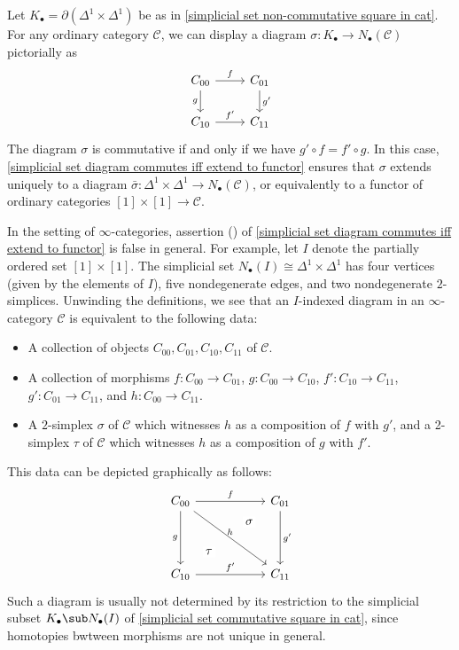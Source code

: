 \begin{example}\label{simplicial set commutative square in cat}
Let $K_\bullet=\partial(\Delta^1\times\Delta^1)$ be as in \cref{simplicial set non-commutative square in cat}. For any ordinary category $\mathcal{C}$, we can display a diagram $\sigma:K_\bullet\to N_\bullet(\mathcal{C})$ pictorially as
\[\begin{tikzcd}
C_{00}\ar[r,"f"]\ar[d,swap,"g"]&C_{01}\ar[d,"g'"]\\
C_{10}\ar[r,"f'"]&C_{11}
\end{tikzcd}\]
The diagram $\sigma$ is commutative if and only if we have $g'\circ f=f'\circ g$. In this case, \cref{simplicial set diagram commutes iff extend to functor} ensures that $\sigma$ extends uniquely to a diagram $\bar{\sigma}:\Delta^1\times\Delta^1\to N_\bullet(\mathcal{C})$, or equivalently to a functor of ordinary categories $[1]\times[1]\to\mathcal{C}$.
\end{example}
\begin{example}\label{simplicial set inf-cat square diagram}
In the setting of $\infty$-categories, assertion () of \cref{simplicial set diagram commutes iff extend to functor} is false in general. For example, let $I$ denote the partially ordered set $[1]\times[1]$. The simplicial set $N_\bullet(I)\cong\Delta^1\times\Delta^1$ has four vertices (given by the elements of $I$), five nondegenerate edges, and two nondegenerate $2$-simplices. Unwinding the definitions, we see that an $I$-indexed diagram in an $\infty$-category $\mathcal{C}$ is equivalent to the following data:
\begin{itemize}
\item A collection of objects $C_{00},C_{01},C_{10},C_{11}$ of $\mathcal{C}$.
\item A collection of morphisms $f:C_{00}\to C_{01}$, $g:C_{00}\to C_{10}$, $f':C_{10}\to C_{11}$, $g':C_{01}\to C_{11}$, and $h:C_{00}\to C_{11}$.
\item A $2$-simplex $\sigma$ of $\mathcal{C}$ which witnesses $h$ as a composition of $f$ with $g'$, and a 2-simplex $\tau$ of $\mathcal{C}$ which witnesses $h$ as a composition of $g$ with $f'$.
\end{itemize}
This data can be depicted graphically as follows:
\[\begin{tikzcd}
C_{00}\ar[dd,swap,"g"]\ar[rrdd,"h"{anchor=south}]\ar[rr,"f"]&{}&C_{01}\ar[dd,"g'"]\ar[ld,phantom,"\sigma"description]\\
&{}&\\
C_{10}\ar[rr,"f'"]\ar[ru,phantom,"\tau"description]&&C_{11}
\end{tikzcd}\]
Such a diagram is usually not determined by its restriction to the simplicial subset $K_\bullet\sub N_\bullet(I)$ of \cref{simplicial set commutative square in cat}, since homotopies bwtween morphisms are not unique in general.
\end{example}
